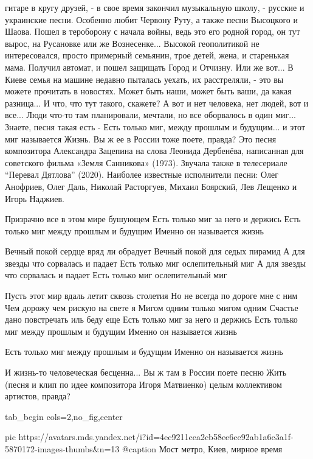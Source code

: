 гитаре в кругу друзей, - в свое время закончил музыкальную школу, - русские и
украинские песни.  Особенно любит Червону Руту, а также песни Высоцкого и
Шаова.  Пошел в тероборону с начала войны, ведь это его родной город, он тут
вырос, на Русановке или же Вознесенке... Высокой геополитикой не интересовался,
просто примерный семьянин, трое детей, жена, и старенькая мама.  Получил
автомат, и пошел защищать Город и Отчизну. Или же вот... В Киеве семья на
машине недавно пыталась уехать, их расстреляли, - это вы можете прочитать в
новостях. Может быть наши, может быть ваши, да какая разница... И что, что тут
такого, скажете?  А вот и нет человека, нет людей, вот и все... Люди что-то там
планировали, мечтали, но все оборвалось в один миг...  Знаете, песня такая есть
- Есть только миг, между прошлым и будущим... и этот миг называется Жизнь. Вы ж
ее в России тоже поете, правда?  Это песня композитора Александра Зацепина на
слова Леонида Дербенёва, написанная для советского фильма «Земля Санникова»
(1973).  Звучала также в телесериале \enquote{Перевал Дятлова} (2020). Наиболее
известные исполнители песни: Олег Анофриев, Олег Даль, Николай Расторгуев,
Михаил Боярский, Лев Лещенко и Игорь Наджиев.

\raggedcolumns
\begin{multicols}{2} %
\setlength{\parindent}{0pt}
\obeycr
Призрачно все в этом мире бушующем
Есть только миг за него и держись
Есть только миг между прошлым и будущим
Именно он называется жизнь

Вечный покой сердце вряд ли обрадует
Вечный покой для седых пирамид
А для звезды что сорвалась и падает
Есть только миг ослепительный миг
А для звезды что сорвалась и падает
Есть только миг ослепительный миг

Пусть этот мир вдаль летит сквозь столетия
Но не всегда по дороге мне с ним
Чем дорожу чем рискую на свете я
Мигом одним только мигом одним
Счастье дано повстречать иль беду еще
Есть только миг за него и держись
Есть только миг между прошлым и будущим
Именно он называется жизнь

Есть только миг между прошлым и будущим
Именно он называется жизнь
\restorecr
\end{multicols} %

И жизнь-то человеческая бесценна... Вы ж там в России поете песню Жить (песня и
клип по идее композитора Игоря Матвиенко) целым коллективом артистов, правда?

\ifcmt
  tab_begin cols=2,no_fig,center

     pic https://avatars.mds.yandex.net/i?id=4ec9211cea2cb58ee6ce92ab1a6c3a1f-5870172-images-thumbs&n=13
		 @caption Мост метро, Киев, мирное время

